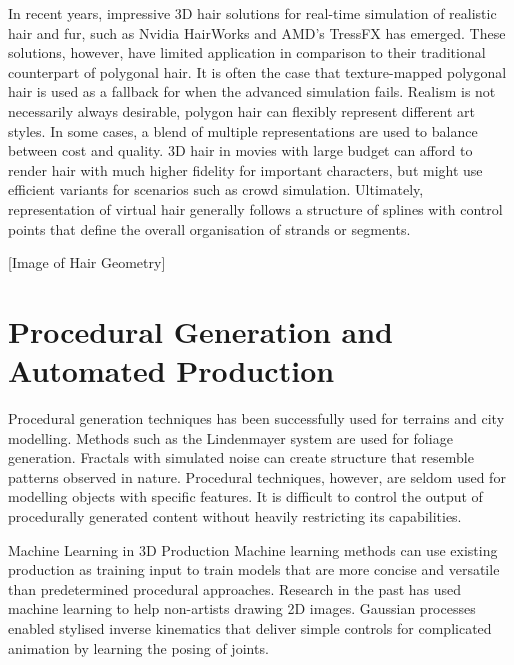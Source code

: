 \documentclass[ %
                    author={Dillon Keith Diep},
                supervisor={Dr. Carl Henrik Ek},
                    degree={MEng},
                     title={Assisted Content Generation for 3D Hair Geometry},
                  subtitle={[INCOMPLETE DRAFT, NOT FOR SUBMISSION]},
                      type={Research},
                      year={2014} ]{dissertation}
\begin{document}
In recent years, impressive 3D hair solutions for real-time simulation of realistic hair and fur, such as Nvidia HairWorks and AMD’s TressFX has emerged. These solutions, however, have limited application in comparison to their traditional counterpart of polygonal hair. It is often the case that texture-mapped polygonal hair is used as a fallback for when the advanced simulation fails. Realism is not necessarily always desirable, polygon hair can flexibly represent different art styles. In some cases, a blend of multiple representations are used to balance between cost and quality. 3D hair in movies with large budget can afford to render hair with much higher fidelity for important characters, but might use efficient variants for scenarios such as crowd simulation. Ultimately, representation of virtual hair generally follows a structure of splines with control points that define the overall organisation of strands or segments.


[Image of Hair Geometry]

\section{Procedural Generation and Automated Production}
\noindent
Procedural generation techniques has been successfully used for terrains and city modelling. Methods such as the Lindenmayer system are used for foliage generation. Fractals with simulated noise can create structure that resemble patterns observed in nature. Procedural techniques, however, are seldom used for modelling objects with specific features. It is difficult to control the output of procedurally generated content without heavily restricting its capabilities.
\cite{procedural1}
\cite{procedural2}

Machine Learning in 3D Production
Machine learning methods can use existing production as training input to train models that are more concise and versatile than predetermined procedural approaches. Research in the past has used machine learning to help non-artists drawing 2D images. Gaussian processes enabled stylised inverse kinematics that deliver simple controls for complicated animation by learning the posing of joints. 
\cite{MLMethods}
\end{document}
